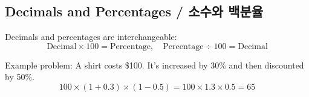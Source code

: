 \newpage
\subsection{Decimals and Percentages / 소수와 백분율}
Decimals and percentages are interchangeable:  
\[
\text{Decimal} \times 100 = \text{Percentage}, \quad \text{Percentage} \div 100 = \text{Decimal}
\]  
\blockquote{}  

Example problem: A shirt costs \$100. It’s increased by 30\% and then discounted by 50\%.  
\[
100 \times (1+0.3) \times (1-0.5) = 100 \times 1.3 \times 0.5 = 65
\]  
\blockquote{}  
